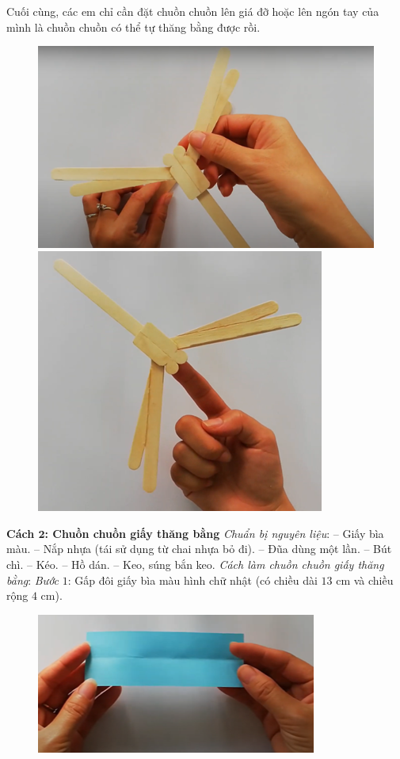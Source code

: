 \begin{multicols}{2}
\begin{figure}[H]
		\vspace*{-10pt}
	\end{figure}
	Cuối cùng, các em chỉ cần đặt chuồn chuồn lên giá đỡ hoặc lên ngón tay của mình là chuồn chuồn có thể tự thăng bằng được rồi.
	\begin{figure}[H]
		\vspace*{-5pt}
		\centering
		\captionsetup{labelformat= empty, justification=centering}
		\includegraphics[height=0.35\linewidth]{60}
		\includegraphics[height=0.35\linewidth]{61}
		\vspace*{-10pt}
	\end{figure}
	\textbf{\color{toancuabi}Cách $\pmb{2}$: Chuồn chuồn giấy thăng bằng}
	\vskip 0.1cm
	\textit{Chuẩn bị nguyên liệu}:
	\vskip 0.1cm
	-- Giấy bìa màu.
	\vskip 0.1cm
	-- Nắp nhựa (tái sử dụng từ chai nhựa bỏ đi).
	\vskip 0.1cm
	-- Đũa dùng một lần.
	\vskip 0.1cm
	-- Bút chì.
	\vskip 0.1cm
	-- Kéo.
	\vskip 0.1cm
	-- Hồ dán.
	\vskip 0.1cm
	-- Keo, súng bắn keo.
	\vskip 0.1cm
	\textit{Cách làm chuồn chuồn giấy thăng bằng}:
	\vskip 0.1cm
	\textit{Bước} $1$: Gấp đôi giấy bìa màu hình chữ nhật (có chiều dài $13$ cm và chiều rộng $4$ cm).
	\begin{figure}[H]
		\vspace*{-5pt}
		\centering
		\captionsetup{labelformat= empty, justification=centering}
		\includegraphics[width=0.7\linewidth]{62}
		

\end{figure}
\end{multicols}
